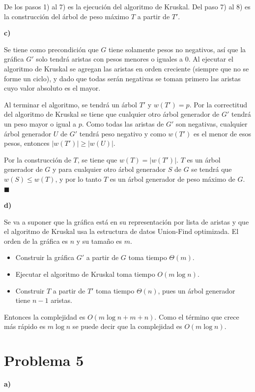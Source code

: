 \documentclass{article}
\begin{document}
De los pasos 1) al 7) es la ejecución del algoritmo de Kruskal. Del paso 7) al 8) es la construcción del árbol de peso máximo $T$ a partir de $T'$.

\textbf{c)}

Se tiene como precondición que $G$ tiene solamente pesos no negativos, así que la gráfica $G'$ solo tendrá aristas con pesos menores o iguales a 0. Al ejecutar el algoritmo de Kruskal se agregan las aristas en orden creciente (siempre que no se forme un ciclo), y dado que todas serán negativas se toman primero las aristas cuyo valor absoluto es el mayor.

Al terminar el algoritmo, se tendrá un árbol $T'$ y $w(T') = p$. Por la correctitud del algoritmo de Kruskal se tiene que cualquier otro árbol generador de $G'$ tendrá un peso mayor o igual a $p$. Como todas las aristas de $G'$ son negativas, cualquier árbol generador $U$ de $G'$ tendrá peso negativo y como $w(T')$ es el menor de esos pesos, entonces $|w(T')| \geq |w(U)|$.

Por la construcción de $T$, se tiene que $w(T) = |w(T')|$. $T$ es un árbol generador de $G$ y para cualquier otro árbol generador $S$ de $G$ se tendrá que $w(S) \leq w(T)$, y por lo tanto $T$ es un árbol generador de peso máximo de $G$. $\blacksquare$

\textbf{d)}

Se va a suponer que la gráfica está en su representación por lista de aristas y que el algoritmo de Kruskal usa la estructura de datos Union-Find optimizada. El orden de la gráfica es $n$ y su tamaño es $m$.

\begin{itemize}
\item Construir la gráfica $G'$ a partir de $G$ toma tiempo $\Theta(m)$.
\item Ejecutar el algoritmo de Kruskal toma tiempo $O(m \log n)$.
\item Construir $T$ a partir de $T'$ toma tiempo $\Theta(n)$, pues un árbol generador tiene $n-1$ aristas.
\end{itemize}

Entonces la complejidad es $O(m \log n + m + n)$. Como el término que crece más rápido es $m \log n$ se puede decir que la complejidad es $O(m \log n)$.

\section*{Problema 5}

\textbf{a)}
\end{document}
